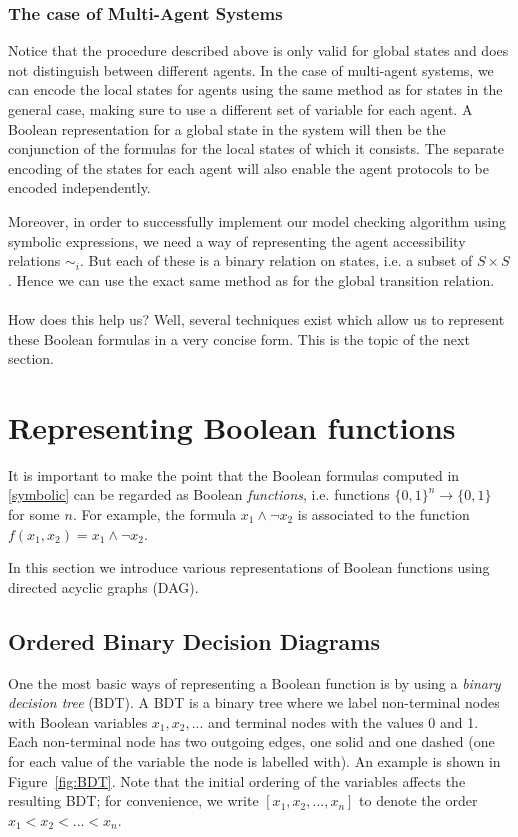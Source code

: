 \documentclass[11pt]{report}
\begin{document}
\subsubsection{The case of Multi-Agent Systems}

Notice that the procedure described above is only valid for global states and does not distinguish between different agents. 
In the case of multi-agent systems, we can encode the local states for agents using the same method as for states in the general case, making sure to use a different set of variable for each agent. A Boolean representation for a global state in the system will then be the conjunction of the formulas for the local states of which it consists. The separate encoding of the states for each agent will also enable the agent protocols to be encoded independently.

Moreover, in order to successfully implement our model checking algorithm using symbolic expressions, we need a way of representing the agent accessibility relations $\sim_i$.
But each of these is a binary relation on states, i.e. a subset of $S \times S$. Hence we can use the exact same method as for the global transition relation. 
\\\\

How does this help us? Well, several techniques exist which allow us to represent these Boolean formulas in a very concise form. This is the topic of the next section.

\section{Representing Boolean functions}

It is important to make the point that the Boolean formulas computed in \ref{symbolic} can be regarded as Boolean \textit{functions}, i.e. functions $\{0, 1\}^n \rightarrow \{0, 1\}$ for some $n$. For example, the formula $x_1 \land \lnot x_2$ is associated to the function $f(x_1, x_2) = x_1 \land \lnot x_2$.

In this section we introduce various representations of Boolean functions using directed acyclic graphs (DAG). 

\subsection{Ordered Binary Decision Diagrams}

One the most basic ways of representing a Boolean function is by using a \textit{binary decision tree} (BDT). A BDT is a binary tree where we label non-terminal nodes with Boolean variables $x_1, x_2, ...$ and terminal nodes with the values 0 and 1. Each non-terminal node has two outgoing edges, one solid and one dashed (one for each value of the variable the node is labelled with). An example is shown in Figure~\ref{fig:BDT}. Note that the initial ordering of the variables affects the resulting BDT; for convenience, we write $[x_1, x_2, ..., x_n]$ to denote the order $x_1 < x_2 < ... < x_n$.
\end{document}
